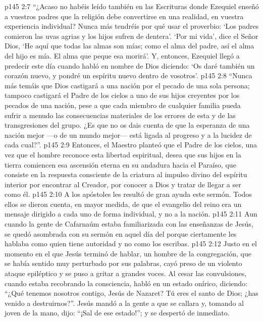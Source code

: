 \vs p145 2:7 “¿Acaso no habéis leído también en las Escrituras donde Ezequiel enseñó a vuestros padres que la religión debe convertirse en una realidad, en vuestra experiencia individual? Nunca más tendréis por qué usar el proverbio: ‘Los padres comieron las uvas agrias y los hijos sufren de dentera’. ‘Por mi vida’, dice el Señor Dios, ‘He aquí que todas las almas son mías; como el alma del padre, así el alma del hijo es mía. El alma que peque esa morirá’. Y, entonces, Ezequiel llegó a predecir este día cuando habló en nombre de Dios diciendo: ‘Os daré también un corazón nuevo, y pondré un espíritu nuevo dentro de vosotros’.
\vs p145 2:8 “Nunca más temáis que Dios castigará a una nación por el pecado de una sola persona; tampoco castigará el Padre de los cielos a uno de sus hijos creyentes por los pecados de una nación, pese a que cada miembro de cualquier familia pueda sufrir a menudo las consecuencias materiales de los errores de esta y de las transgresiones del grupo. ¿Es que no os dais cuenta de que la esperanza de una nación mejor ---o de un mundo mejor--- está ligada al progreso y a la lucidez de cada cual?”.
\vs p145 2:9 Entonces, el Maestro planteó que el Padre de los cielos, una vez que el hombre reconoce esta libertad espiritual, desea que sus hijos en la tierra comiencen esa ascensión eterna en su andadura hacia el Paraíso, que consiste en la respuesta consciente de la criatura al impulso divino del espíritu interior por encontrar al Creador, por conocer a Dios y tratar de llegar a ser como él.
\vs p145 2:10 \pc A los apóstoles les resultó de gran ayuda este sermón. Todos ellos se dieron cuenta, en mayor medida, de que el evangelio del reino era un mensaje dirigido a cada uno de forma individual, y no a la nación.
\vs p145 2:11 Aun cuando la gente de Cafarnaúm estaba familiarizada con las enseñanzas de Jesús, se quedó asombrada con su sermón en aquel día del  porque ciertamente les hablaba como quien tiene autoridad y no como los escribas.
\vs p145 2:12 \pc Justo en el momento en el que Jesús terminó de hablar, un hombre de la congregación, que se había sentido muy perturbado por sus palabras, cayó preso de un violento ataque epiléptico y se puso a gritar a grandes voces. Al cesar las convulsiones, cuando estaba recobrando la consciencia, habló en un estado onírico, diciendo: “¿Qué tenemos nosotros contigo, Jesús de Nazaret? Tú eres el santo de Dios; ¿has venido a destruirnos?”. Jesús mandó a la gente a que se callara y, tomando al joven de la mano, dijo: “¡Sal de ese estado!”; y se despertó de inmediato.
